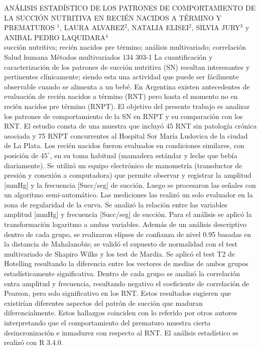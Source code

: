 \A
{ANÁLISIS ESTADÍSTICO DE LOS PATRONES DE COMPORTAMIENTO DE LA SUCCIÓN NUTRITIVA EN RECIÉN NACIDOS A TÉRMINO Y PREMATUROS}
{$^1$, LAURA ALVAREZ$^2$, NATALIA ELISEI$^2$, SILVIA JURY$^3$ y ANIBAL PEDRO LAQUIDARA$^4$}
{
\\}
{succión nutritiva; recién nacidos pre término; análisis multivariado; correlación} 
 {Salud humana} 
 {Métodos multivariados} 
 {134} 
 {303-1}
{La cuantificación y caracterización de los patrones de succión nutritiva (SN) resultan interesantes y pertinentes clínicamente; siendo esta una actividad que puede ser fácilmente observable cuando se alimenta a un bebé. En Argentina existen antecedentes de evaluación de recién nacidos a término (RNT) pero hasta el momento no en recién nacidos pre término (RNPT). El objetivo del presente trabajo es analizar los patrones de comportamiento de la SN en RNPT y su comparación con los RNT. El estudio consta de una muestra que incluyó 45 RNT sin patología crónica asociada y 75 RNPT concurrentes al Hospital Sor María Ludovica de la ciudad de La Plata. Los recién nacidos fueron evaluados en condiciones similares, con posición de $45^\circ$, en su toma habitual (mamadera estándar y leche que bebía diariamente). Se utilizó un equipo electrónico de manometría (transductor de presión y conexión a computadora) que permite observar y registrar la amplitud [mmHg] y la frecuencia [Succ/seg] de succión. Luego se procesaron las señales con un algoritmo semi-automático. Las mediciones las realizó un solo evaluador en la zona de regularidad de la curva. Se analizó la relación entre las variables amplitud [mmHg] y frecuencia [Succ/seg] de succión. Para el análisis se aplicó la transformación logaritmo a ambas variables. Además de un análisis descriptivo dentro de cada grupo, se realizaron elipses de confianza de nivel 0.95 basadas en la distancia de Mahalanobis; se validó el supuesto de normalidad con el test multivariado de Shapiro Wilks y los test de Mardia. Se aplicó el test T2 de Hotelling resultando la diferencia entre los vectores de medias de ambos grupos estadísticamente significativa. Dentro de cada grupo se analizó la correlación entra amplitud y frecuencia, resultando negativo el coeficiente de correlación de Pearson, pero solo significativo en los RNT. Estos resultados sugieren que existirían diferentes aspectos del patrón de succión que maduran diferencialmente. Estos hallazgos coinciden con lo referido por otros autores interpretando que el comportamiento del prematuro muestra cierta desincronización e inmadurez con respecto al RNT. El análisis estadístico se realizó con R 3.4.0. }
